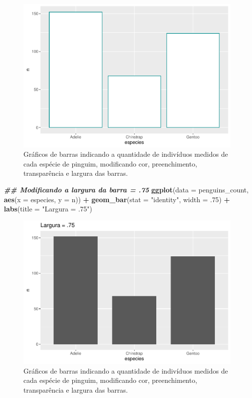 \documentclass[
]{article}
\newenvironment{Shaded}{\begin{snugshade}}{\end{snugshade}}
\newcommand{\AttributeTok}[1]{\textcolor[rgb]{0.13,0.29,0.53}{#1}}
\newcommand{\DecValTok}[1]{\textcolor[rgb]{0.00,0.00,0.81}{#1}}
\newcommand{\DocumentationTok}[1]{\textcolor[rgb]{0.56,0.35,0.01}{\textbf{\textit{#1}}}}
\newcommand{\FunctionTok}[1]{\textcolor[rgb]{0.13,0.29,0.53}{\textbf{#1}}}
\newcommand{\NormalTok}[1]{#1}
\newcommand{\SpecialCharTok}[1]{\textcolor[rgb]{0.81,0.36,0.00}{\textbf{#1}}}
\newcommand{\StringTok}[1]{\textcolor[rgb]{0.31,0.60,0.02}{#1}}
\begin{document}
\begin{figure}
\includegraphics[width=0.75\linewidth,height=0.75\textheight]{epr_files/figure-latex/fig-bar-species-color-2} \caption{Gráficos de barras indicando a quantidade de indivíduos medidos de cada espécie de pinguim, modificando cor, preenchimento, transparência e largura das barras.}\label{fig:fig-bar-species-color-2}
\end{figure}

\begin{Shaded}
\begin{Highlighting}[]
\DocumentationTok{\#\# Modificando a largura da barra = .75}
\FunctionTok{ggplot}\NormalTok{(}\AttributeTok{data =}\NormalTok{ penguins\_count, }\FunctionTok{aes}\NormalTok{(}\AttributeTok{x =}\NormalTok{ especies, }\AttributeTok{y =}\NormalTok{ n)) }\SpecialCharTok{+}
    \FunctionTok{geom\_bar}\NormalTok{(}\AttributeTok{stat =} \StringTok{"identity"}\NormalTok{, }\AttributeTok{width =}\NormalTok{ .}\DecValTok{75}\NormalTok{) }\SpecialCharTok{+}
    \FunctionTok{labs}\NormalTok{(}\AttributeTok{title =} \StringTok{"Largura = .75"}\NormalTok{)}
\end{Highlighting}
\end{Shaded}

\begin{figure}
\includegraphics[width=0.75\linewidth,height=0.75\textheight]{epr_files/figure-latex/fig-bar-species-color-3} \caption{Gráficos de barras indicando a quantidade de indivíduos medidos de cada espécie de pinguim, modificando cor, preenchimento, transparência e largura das barras.}\label{fig:fig-bar-species-color-3}
\end{figure}
\end{document}
